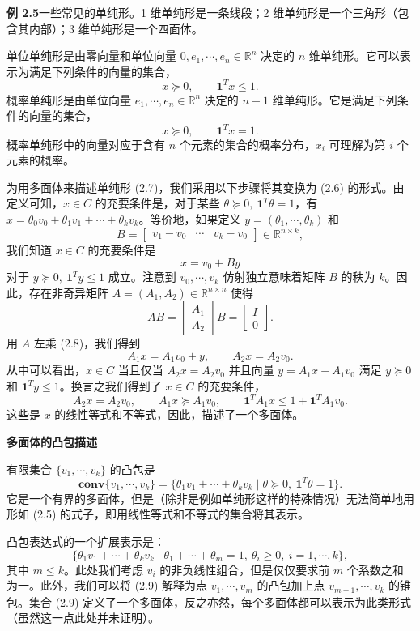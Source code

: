 \documentclass[UTF8, 12pt, fontset=fandol, oneside]{ctexart}
\begin{document}
\noindent\textbf{例 2.5}\quad 一些常见的单纯形。1 维单纯形是一条线段；2 维单纯形是一个三角形（包含其内部）；3 维单纯形是一个四面体。

单位单纯形是由零向量和单位向量 $0,e_1,\cdots,e_n\in\mathbb{R}^n$ 决定的 $n$ 维单纯形。它可以表示为满足下列条件的向量的集合，
\[
  x\succeq 0,\qquad \mathbf{1}^Tx\le 1.
\]
概率单纯形是由单位向量 $e_1,\cdots,e_n\in\mathbb{R}^n$ 决定的 $n-1$ 维单纯形。它是满足下列条件的向量的集合，
\[
  x\succeq 0,\qquad \mathbf{1}^Tx=1.
\]
概率单纯形中的向量对应于含有 $n$ 个元素的集合的概率分布，$x_i$ 可理解为第 $i$ 个元素的概率。

为用多面体来描述单纯形 (2.7)，我们采用以下步骤将其变换为 (2.6) 的形式。由定义可知，$x\in C$ 的充要条件是，对于某些 $\theta\succeq 0,\ \mathbf{1}^T\theta=1$，有 $x=\theta_0v_0+\theta_1v_1+\cdots+\theta_kv_k$。等价地，如果定义 $y=(\theta_1,\cdots,\theta_k)$ 和
\[
  B=\begin{bmatrix} v_1-v_0 & \cdots & v_k-v_0 \end{bmatrix}\in\mathbb{R}^{n\times k},
\]
我们知道 $x\in C$ 的充要条件是
\begin{equation}
  x=v_0+By
  \tag{2.8}
\end{equation}
对于 $y\succeq 0,\ \mathbf{1}^Ty\le 1$ 成立。注意到 $v_0,\cdots,v_k$ 仿射独立意味着矩阵 $B$ 的秩为 $k$。因此，存在非奇异矩阵 $A=(A_1,A_2)\in\mathbb{R}^{n\times n}$ 使得
\[
  AB=
  \begin{bmatrix}
    A_1\\
    A_2
  \end{bmatrix}B
  =
  \begin{bmatrix}
    I\\
    0
  \end{bmatrix}.
\]
用 $A$ 左乘 (2.8)，我们得到
\[
  A_1x=A_1v_0+y,\qquad A_2x=A_2v_0.
\]
从中可以看出，$x\in C$ 当且仅当 $A_2x=A_2v_0$ 并且向量 $y=A_1x-A_1v_0$ 满足 $y\succeq 0$ 和 $\mathbf{1}^Ty\le 1$。换言之我们得到了 $x\in C$ 的充要条件，
\[
  A_2x=A_2v_0,\qquad A_1x\succeq A_1v_0,\qquad \mathbf{1}^TA_1x\le 1+\mathbf{1}^TA_1v_0.
\]
这些是 $x$ 的线性等式和不等式，因此，描述了一个多面体。

\noindent\textbf{多面体的凸包描述}

有限集合 $\{v_1,\cdots,v_k\}$ 的凸包是
\[
  \mathbf{conv}\{v_1,\cdots,v_k\}
  =\{\theta_1v_1+\cdots+\theta_kv_k\mid \theta\succeq 0,\ \mathbf{1}^T\theta=1\}.
\]
它是一个有界的多面体，但是（除非是例如单纯形这样的特殊情况）无法简单地用形如 (2.5) 的式子，即用线性等式和不等式的集合将其表示。

凸包表达式的一个扩展表示是：
\begin{equation}
  \{\theta_1v_1+\cdots+\theta_kv_k\mid \theta_1+\cdots+\theta_m=1,\ \theta_i\ge 0,\ i=1,\cdots,k\},
  \tag{2.9}
\end{equation}
其中 $m\le k$。此处我们考虑 $v_i$ 的非负线性组合，但是仅仅要求前 $m$ 个系数之和为一。此外，我们可以将 (2.9) 解释为点 $v_1,\cdots,v_m$ 的凸包加上点 $v_{m+1},\cdots,v_k$ 的锥包。集合 (2.9) 定义了一个多面体，反之亦然，每个多面体都可以表示为此类形式（虽然这一点此处并未证明）。
\end{document}
